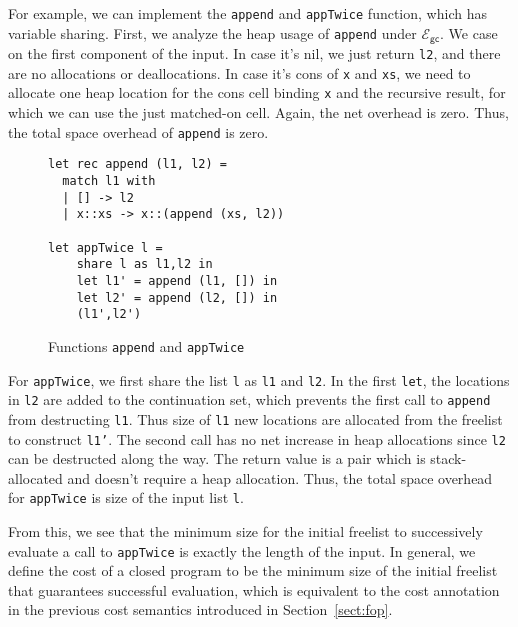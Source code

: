 \documentclass{easychair}
\newcommand{\ms}[1]{\ensuremath{\mathsf{#1}}}
\newcommand{\gcSem}{\ensuremath{\mathcal{E}_{\ms{gc}}}}
\theoremstyle{definition}
\begin{document}
For example, we can implement the \texttt{append} and \texttt{appTwice} function, 
which has variable sharing. First, we analyze the heap usage of \texttt{append} under 
\gcSem{}. We case on the first component of the input. In case it's nil, 
we just return \texttt{l2}, and there are no allocations or deallocations. In case it's
cons of \texttt{x} and \texttt{xs}, we need to allocate one heap location for the
cons cell binding \texttt{x} 
and the recursive result, for which we can use the just matched-on cell. Again, 
the net overhead is zero. Thus, the total space overhead of \texttt{append} is zero.
\begin{wrapfigure}{r}{0.4\textwidth}
	\vspace{-15pt}
		\begin{center}
\begin{verbatim}
let rec append (l1, l2) =
  match l1 with
  | [] -> l2
  | x::xs -> x::(append (xs, l2))

let appTwice l = 
    share l as l1,l2 in
    let l1' = append (l1, []) in 
    let l2' = append (l2, []) in 
    (l1',l2')
\end{verbatim}
			\end{center}
				\vspace{-15pt}
			\caption{Functions \texttt{append} and \texttt{appTwice}}
		\vspace{-10pt}
\label{fig:dfs}
\end{wrapfigure}
%
For \texttt{appTwice}, we first share the list \texttt{l} as \texttt{l1} and 
\texttt{l2}. In the first \texttt{let}, the locations in \texttt{l2} are added to the
continuation set, which prevents the 
first call to \texttt{append} from destructing \texttt{l1}. Thus size of \texttt{l1} 
new locations are allocated from the freelist to construct \texttt{l1'}. 
The second call has no net increase in heap allocations since \texttt{l2} can be 
destructed along the way. 
The return value is a pair which is stack-allocated and doesn't require a heap 
allocation. Thus, the total space overhead for \texttt{appTwice} 
is size of the input list \texttt{l}.

From this, we see that the minimum size for the initial freelist to successively evaluate 
a call to \texttt{appTwice} is exactly the length of the input. In general, we 
define the cost of a closed program to be the minimum size of the initial freelist that
guarantees successful evaluation, which is
equivalent to the cost annotation in the previous cost semantics introduced in 
Section~\ref{sect:fop}.
\end{document}
